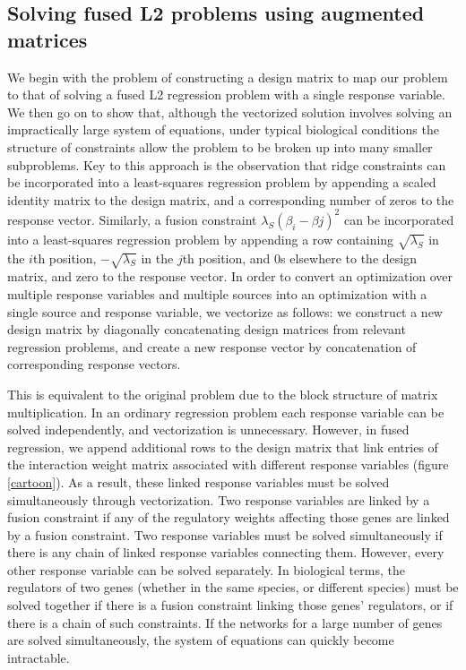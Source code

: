 \documentclass[11pt]{article}
\begin{document}
\subsection{Solving fused L2 problems using augmented matrices}
We begin with the problem of constructing a design matrix to map our problem to that of solving a fused L2 regression problem with a single response variable. 
We then go on to show that, although the vectorized solution involves solving an impractically large system of equations, under typical biological conditions the structure of constraints allow the problem to be broken up into many smaller subproblems. 
Key to this approach is the observation that ridge constraints can be incorporated into a least-squares regression problem by appending a scaled identity matrix to the design matrix, and a corresponding number of zeros to the response vector. 
Similarly, a fusion constraint $\lambda_S (\beta_{i} - \beta{j})^2$ can be incorporated into a least-squares regression problem by appending a row containing $\sqrt{\lambda_S}$ in the $i$th position, $-\sqrt{\lambda_S}$ in the $j$th position, and $0$s elsewhere to the design matrix, and zero to the response vector. 
In order to convert an optimization over multiple response variables and multiple sources into an optimization with a single source and response variable, we vectorize as follows: we construct a new design matrix by diagonally concatenating design matrices from relevant regression problems, and create a new response vector by concatenation of corresponding response vectors. 

This is equivalent to the original problem due to the block structure of matrix multiplication. 
In an ordinary regression problem each response variable can be solved independently, and vectorization is unnecessary. 
However, in fused regression, we append additional rows to the design matrix that link entries of the interaction weight matrix associated with different response variables (figure \ref{cartoon}). 
As a result, these linked response variables must be solved simultaneously through vectorization. 
Two response variables are linked by a fusion constraint if any of the regulatory weights affecting those genes are linked by a fusion constraint. 
Two response variables must be solved simultaneously if there is any chain of linked response variables connecting them. 
However, every other response variable can be solved separately. 
In biological terms, the regulators of two genes (whether in the same species, or different species) must be solved together if there is a fusion constraint linking those genes' regulators, or if there is a chain of such constraints. 
If the networks for a large number of genes are solved simultaneously, the system of equations can quickly become intractable. 
\end{document}
